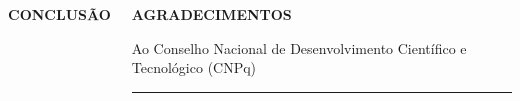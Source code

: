 \documentclass[serif,20pt]{beamer}
\begin{document}
\begin{frame}[t]
\begin{columns}[t]
\begin{block}{\centering\bfseries CONCLUSÃO}
\end{block}

\begin{block}{\centering\bfseries AGRADECIMENTOS}

Ao Conselho Nacional de Desenvolvimento Científico e Tecnológico (CNPq)

\rule{10cm}{0.4pt}



\end{block}


\end{columns}    
\end{frame}
\end{document}
